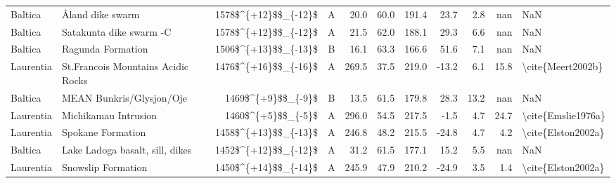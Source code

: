 \begin{longtable}{p{1 in}p{1 in}rrrrrrrr}
                       Baltica &                                   Åland dike swarm &   1578\$\textasciicircum \{+12\}\$\$\_\{-12\}\$ &      A &      20.0 &      60.0 & 191.4 &  23.7 &       2.8 &         nan &                                                NaN \\
                       Baltica &                            Satakunta dike swarm -C &   1578\$\textasciicircum \{+12\}\$\$\_\{-12\}\$ &      A &      21.5 &      62.0 & 188.1 &  29.3 &       6.6 &         nan &                                                NaN \\
                       Baltica &                                  Ragunda Formation &   1506\$\textasciicircum \{+13\}\$\$\_\{-13\}\$ &      B &      16.1 &      63.3 & 166.6 &  51.6 &       7.1 &         nan &                                                NaN \\
                     Laurentia &                 St.Francois Mountains Acidic Rocks &   1476\$\textasciicircum \{+16\}\$\$\_\{-16\}\$ &      A &     269.5 &      37.5 & 219.0 & -13.2 &       6.1 &        15.8 &                                  \textbackslash cite\{Meert2002b\} \\
                       Baltica &                           MEAN Bunkris/Glysjon/Oje &     1469\$\textasciicircum \{+9\}\$\$\_\{-9\}\$ &      B &      13.5 &      61.5 & 179.8 &  28.3 &      13.2 &         nan &                                                NaN \\
                     Laurentia &                               Michikamau Intrusion &     1460\$\textasciicircum \{+5\}\$\$\_\{-5\}\$ &      A &     296.0 &      54.5 & 217.5 &  -1.5 &       4.7 &        24.7 &                                 \textbackslash cite\{Emslie1976a\} \\
                     Laurentia &                                  Spokane Formation &   1458\$\textasciicircum \{+13\}\$\$\_\{-13\}\$ &      A &     246.8 &      48.2 & 215.5 & -24.8 &       4.7 &         4.2 &                                 \textbackslash cite\{Elston2002a\} \\
                       Baltica &                    Lake Ladoga basalt, sill, dikes &   1452\$\textasciicircum \{+12\}\$\$\_\{-12\}\$ &      A &      31.2 &      61.5 & 177.1 &  15.2 &       5.5 &         nan &                                                NaN \\
                     Laurentia &                                 Snowslip Formation &   1450\$\textasciicircum \{+14\}\$\$\_\{-14\}\$ &      A &     245.9 &      47.9 & 210.2 & -24.9 &       3.5 &         1.4 &                                 \textbackslash cite\{Elston2002a\} \\

\end{longtable}
